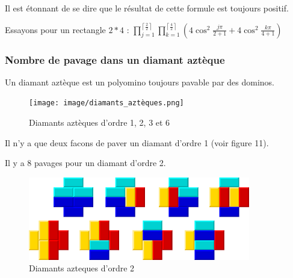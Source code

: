 \documentclass{article}
\begin{document}
Il est étonnant de se dire que le résultat de cette formule est toujours positif.

Essayons pour un rectangle $2*4$ : $\prod_{j=1}^{\left \lceil \frac{2}{2} \right \rceil} \prod_{k=1}^{\left \lceil \frac{4}{2} \right \rceil}\left ( 4\cos^{2}\frac{j\pi }{2+1}+4\cos^{2}\frac{k\pi }{4+1} \right )$




\hspace{2cm}

\subsubsection{Nombre de pavage dans un diamant aztèque}

Un diamant aztèque est un polyomino toujours pavable par des dominos.

\hspace{1cm}

\begin{figure} [!h]
    \center
    \texttt{[image: image/diamants\_aztèques.png]}
    \caption{Diamants aztèques d'ordre 1, 2, 3 et 6}
\end{figure}

\hspace{1cm}

Il n'y a que deux facons de paver un diamant d'ordre 1 (voir figure 11).

Il y a 8 pavages pour un diamant d'ordre 2.

\hspace{2cm}

\begin{figure} [!h]
    \center
    \includegraphics [scale=0.5] {image/diamant_2.png}
    \caption{Diamants azteques d'ordre 2}
\end{figure}

\hspace{1cm}
\end{document}
